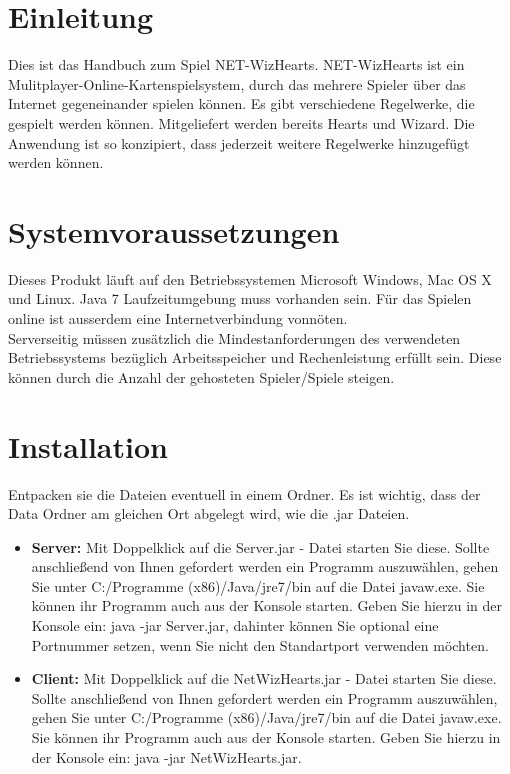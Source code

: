 \documentclass[titlepage,10pt,a4paper]{article}
\begin{document}
\newpage
 
\section{Einleitung}
Dies ist das Handbuch zum Spiel NET-WizHearts. NET-WizHearts ist ein Mulitplayer-Online-Kartenspielsystem, durch das mehrere Spieler über das Internet gegeneinander spielen können. Es gibt verschiedene Regelwerke, die gespielt werden können. Mitgeliefert werden bereits Hearts und Wizard. Die Anwendung ist so konzipiert, dass jederzeit weitere \gls{Regelwerk}e hinzugefügt werden können.

\section{Systemvoraussetzungen}
Dieses Produkt läuft auf den Betriebssystemen Microsoft Windows, Mac OS X und Linux. Java 7 Laufzeitumgebung muss vorhanden sein. Für das Spielen online ist ausserdem eine Internetverbindung vonnöten. \\
\gls{Server}seitig müssen zusätzlich die Mindestanforderungen des verwendeten Betriebssystems bezüglich Arbeitsspeicher und Rechenleistung erfüllt sein. Diese können durch die Anzahl der gehosteten Spieler/Spiele steigen.

\section{Installation}
Entpacken sie die Dateien eventuell in einem Ordner. Es ist wichtig, dass der Data Ordner am gleichen Ort abgelegt wird, wie die .jar Dateien.
\begin{itemize}
	\item \textbf{Server:} Mit Doppelklick auf die Server.jar - Datei starten Sie diese. Sollte anschließend von Ihnen gefordert werden ein Programm auszuwählen, gehen Sie unter C:/Programme (x86)/Java/jre7/bin auf die Datei javaw.exe.
	Sie können ihr Programm auch aus der Konsole starten. Geben Sie hierzu in der Konsole ein: java -jar Server.jar, dahinter können Sie optional eine Portnummer setzen, wenn Sie nicht den Standartport verwenden möchten.
	\item \textbf{Client:}  Mit Doppelklick auf die NetWizHearts.jar - Datei starten Sie diese. Sollte anschließend von Ihnen gefordert werden ein Programm auszuwählen, gehen Sie unter C:/Programme (x86)/Java/jre7/bin auf die Datei javaw.exe.
	Sie können ihr Programm auch aus der Konsole starten. Geben Sie hierzu in der Konsole ein: java -jar NetWizHearts.jar.
\end{itemize}
\end{document}
